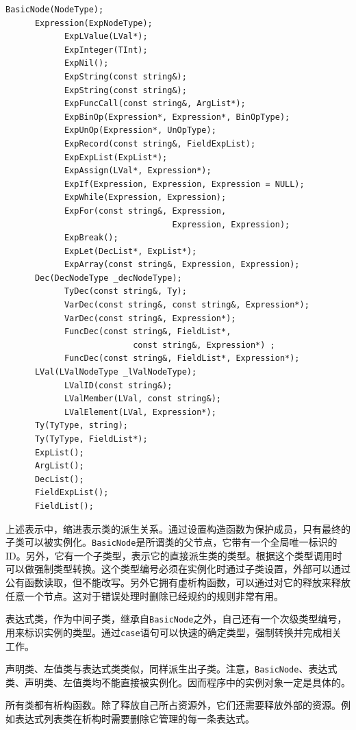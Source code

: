 \begin{verbatim}
BasicNode(NodeType);
      Expression(ExpNodeType);
            ExpLValue(LVal*);
            ExpInteger(TInt);
            ExpNil();
            ExpString(const string&);
            ExpString(const string&);
            ExpFuncCall(const string&, ArgList*);
            ExpBinOp(Expression*, Expression*, BinOpType);
            ExpUnOp(Expression*, UnOpType);
            ExpRecord(const string&, FieldExpList);
            ExpExpList(ExpList*);
            ExpAssign(LVal*, Expression*);
            ExpIf(Expression, Expression, Expression = NULL);
            ExpWhile(Expression, Expression);
            ExpFor(const string&, Expression,
                                  Expression, Expression);
            ExpBreak();
            ExpLet(DecList*, ExpList*);
            ExpArray(const string&, Expression, Expression);
      Dec(DecNodeType _decNodeType);
            TyDec(const string&, Ty);
            VarDec(const string&, const string&, Expression*);
            VarDec(const string&, Expression*);
            FuncDec(const string&, FieldList*,
                          const string&, Expression*) ;
            FuncDec(const string&, FieldList*, Expression*);
      LVal(LValNodeType _lValNodeType);
            LValID(const string&);
            LValMember(LVal, const string&);
            LValElement(LVal, Expression*);
      Ty(TyType, string);
      Ty(TyType, FieldList*);
      ExpList();
      ArgList();
      DecList();
      FieldExpList();
      FieldList();
\end{verbatim}

上述表示中，缩进表示类的派生关系。通过设置构造函数为保护成员，只有最终的子类可以被实例化。\texttt{BasicNode}是所谓类的父节点，它带有一个全局唯一标识的ID。另外，它有一个子类型，表示它的直接派生类的类型。根据这个类型调用时可以做强制类型转换。这个类型编号必须在实例化时通过子类设置，外部可以通过公有函数读取，但不能改写。另外它拥有虚析构函数，可以通过对它的释放来释放任意一个节点。这对于错误处理时删除已经规约的规则非常有用。

表达式类，作为中间子类，继承自\texttt{BasicNode}之外，自己还有一个次级类型编号，用来标识实例的类型。通过\texttt{case}语句可以快速的确定类型，强制转换并完成相关工作。

声明类、左值类与表达式类类似，同样派生出子类。注意，\texttt{BasicNode}、表达式类、声明类、左值类均不能直接被实例化。因而程序中的实例对象一定是具体的。

所有类都有析构函数。除了释放自己所占资源外，它们还需要释放外部的资源。例如表达式列表类在析构时需要删除它管理的每一条表达式。

